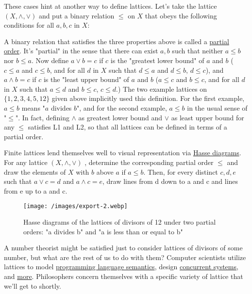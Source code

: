 \documentclass{article} %
\begin{document}
These cases hint at another way to define lattices. Let's take the lattice $ (X, \land, \lor)$ and put a binary relation $ \leq$ on $ X$ that obeys the following conditions for all $ a, b, c$ in $ X$:

\begin{itemize}
\item{reflexivity: $ a \leq a$
\item{antisymmetry: $ a \leq b$ and $ b \leq a$ imply $ a = b$}
\item{transitivity: $ a \leq b$ and $ b \leq c$ imply $ a \leq c$}
\end{itemize}

A binary relation that satisfies the three properties above is called a \href{https://en.wikipedia.org/wiki/Partially_ordered_set}{partial order}. It's "partial" in the sense that there can exist $ a, b$ such that neither $ a \leq b$ nor $ b \leq a$. Now define $ a\lor b = c$ if $ c$ is the "greatest lower bound" of $ a$ and $ b$ ($ c \leq a$ and $ c \leq b$, and for all $ d$ in $ X$ such that $ d \leq a$ and $ d \leq b$, $ d \leq c$), and $ a \land b = c$ if $ c$ is the "least upper bound" of $ a$ and $ b$ ($ a \leq c$ and $ b \leq c$, and for all $ d$ in $ X$ such that $ a \leq d$ and $ b \leq c$, $ c \leq d$.) The two example lattices on $ \{1, 2, 3, 4, 5, 12\}$ given above implicitly used this definition. For the first example, $ a \leq b$ means "$ a$ divides $ b$", and for the second example, $ a \leq b$ in the usual sense of "$ \leq $". In fact, defining $ \land $ as greatest lower bound and $ \lor $ as least upper bound for any $ \leq $ satisfies L1 and L2, so that all lattices can be defined in terms of a partial order.

Finite lattices lend themselves well to visual representation via \href{https://en.wikipedia.org/wiki/Hasse_diagram}{Hasse diagrams}. For any lattice $ (X, \land, \lor)$ , determine the corresponding partial order $ \leq $ and draw the elements of $ X$ with $ b$ above $ a$ if $ a \leq b$. Then, for every distinct $ c, d, e$ such that $ a \lor c = d$ and $ a \land c = e$, draw lines from d down to a and c and lines from e up to a and c.

\begin{figure}
\texttt{[image: /images/export-2.webp]}
\caption{Hasse diagrams of the lattices of divisors of 12 under two partial orders: "a divides b" and "a is less than or equal to b"}
\end{figure}

A number theorist might be satisfied just to consider lattices of divisors of some number, but what are the rest of us to do with them? Computer scientists utilize lattices to model \href{https://en.wikipedia.org/wiki/Knaster%E2%80%93Tarski_theorem}{programming language semantics}, design \href{http://www.diva-portal.org/smash/get/diva2:1268459/FULLTEXT01.pdf}{concurrent systems}, and \href{https://cs.stackexchange.com/questions/12493/what-are-lattices-used-for}{more}. Philosophers concern themselves with a specific variety of lattice that we'll get to shortly.
\end{document}
